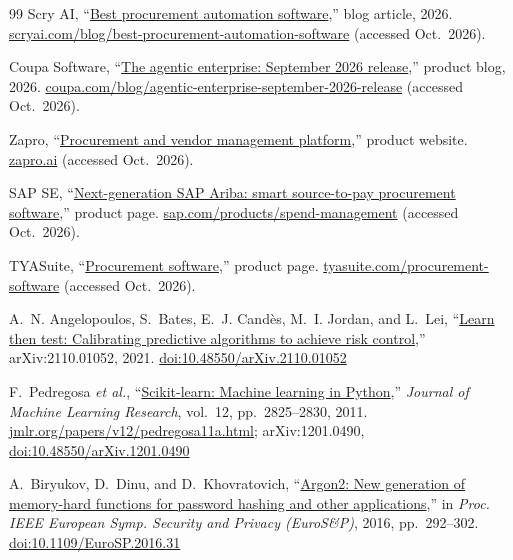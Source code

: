 \begin{thebibliography}{99}
Scry AI, ``\href{https://scryai.com/blog/best-procurement-automation-software/}{Best procurement automation software},'' blog article, 2026. \href{https://scryai.com/blog/best-procurement-automation-software/}{scryai.com/blog/best-procurement-automation-software} (accessed Oct.~2026).

Coupa Software, ``\href{https://www.coupa.com/blog/agentic-enterprise-september-2026-release/}{The agentic enterprise: September 2026 release},'' product blog, 2026. \href{https://www.coupa.com/blog/agentic-enterprise-september-2026-release/}{coupa.com/blog/agentic-enterprise-september-2026-release} (accessed Oct.~2026).

Zapro, ``\href{https://www.zapro.ai/}{Procurement and vendor management platform},'' product website. \href{https://www.zapro.ai/}{zapro.ai} (accessed Oct.~2026).

SAP SE, ``\href{https://www.sap.com/products/spend-management/smart-source-to-pay-procurement-software.html}{Next-generation SAP Ariba: smart source-to-pay procurement software},'' product page. \href{https://www.sap.com/products/spend-management/smart-source-to-pay-procurement-software.html}{sap.com/products/spend-management} (accessed Oct.~2026).

TYASuite, ``\href{https://www.tyasuite.com/procurement-software}{Procurement software},'' product page. \href{https://www.tyasuite.com/procurement-software}{tyasuite.com/procurement-software} (accessed Oct.~2026).

A.~N. Angelopoulos, S.~Bates, E.~J. Cand\`es, M.~I. Jordan, and L.~Lei, ``\href{https://arxiv.org/abs/2110.01052}{Learn then test: Calibrating predictive algorithms to achieve risk control},'' arXiv:2110.01052, 2021. \href{https://doi.org/10.48550/arXiv.2110.01052}{doi:10.48550/arXiv.2110.01052}

F.~Pedregosa \emph{et al.}, ``\href{https://jmlr.org/papers/v12/pedregosa11a.html}{Scikit-learn: Machine learning in Python},'' \emph{Journal of Machine Learning Research}, vol.~12, pp.~2825--2830, 2011. \href{https://jmlr.org/papers/v12/pedregosa11a.html}{jmlr.org/papers/v12/pedregosa11a.html}; arXiv:1201.0490, \href{https://doi.org/10.48550/arXiv.1201.0490}{doi:10.48550/arXiv.1201.0490}

A.~Biryukov, D.~Dinu, and D.~Khovratovich, ``\href{https://doi.org/10.1109/EuroSP.2016.31}{Argon2: New generation of memory-hard functions for password hashing and other applications},'' in \emph{Proc. IEEE European Symp. Security and Privacy (EuroS\&P)}, 2016, pp.~292--302. \href{https://doi.org/10.1109/EuroSP.2016.31}{doi:10.1109/EuroSP.2016.31}


\end{thebibliography}
